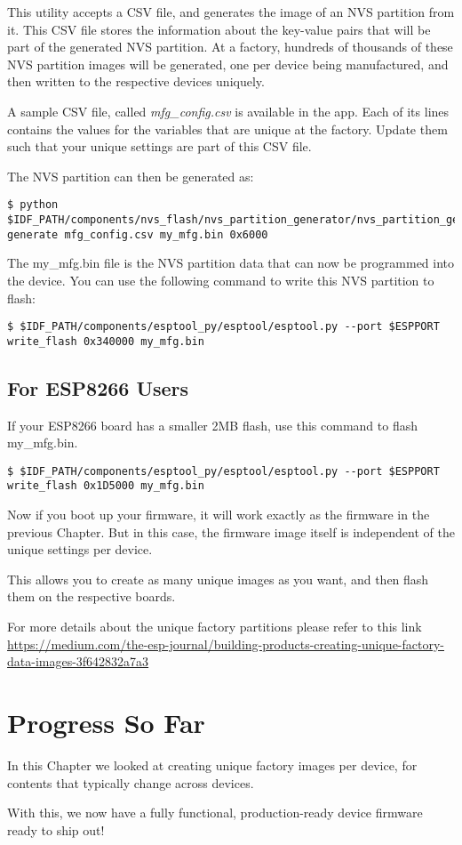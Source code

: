 \documentclass[main.tex]{subfiles}
\begin{document}
This utility accepts a CSV file, and generates the image of an NVS partition from it. This CSV file stores the information about the key-value pairs that will be part of the generated NVS partition. At a factory, hundreds of thousands of these NVS partition images will be generated, one per device being manufactured, and then written to the respective devices uniquely.

A sample CSV file, called \textit{mfg\_config.csv} is available in the app. Each of its lines contains the values for the variables that are unique at the factory.
Update them such that your unique settings are part of this CSV file.

The NVS partition can then be generated as:
\begin{verbatim}
$ python $IDF_PATH/components/nvs_flash/nvs_partition_generator/nvs_partition_gen.py generate mfg_config.csv my_mfg.bin 0x6000
\end{verbatim}

The my\_mfg.bin file is the NVS partition data that can now be programmed into the device. You can use the following command to write this NVS partition to flash:
\begin{verbatim}
$ $IDF_PATH/components/esptool_py/esptool/esptool.py --port $ESPPORT write_flash 0x340000 my_mfg.bin
\end{verbatim}

\subsection{For ESP8266 Users}\label{sec:for_esp8266_users}
If your ESP8266 board has a smaller 2MB flash, use this command to flash my_mfg.bin.
\begin{verbatim}
$ $IDF_PATH/components/esptool_py/esptool/esptool.py --port $ESPPORT write_flash 0x1D5000 my_mfg.bin
\end{verbatim}

Now if you boot up your firmware, it will work exactly as the firmware in the previous Chapter. But in this case, the firmware image itself is independent of the unique settings per device. 

This allows you to create as many unique images as you want, and then flash them on the respective boards.

For more details about the unique factory partitions please refer to this link \url{https://medium.com/the-esp-journal/building-products-creating-unique-factory-data-images-3f642832a7a3}

\section{Progress So Far}
In this Chapter we looked at creating unique factory images per device, for contents that typically change across devices.

With this, we now have a fully functional, production-ready device firmware ready to ship out!
\end{document}
